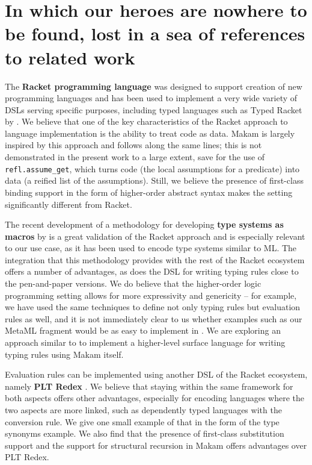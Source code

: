 \section{In which our heroes are nowhere to be found, lost in a sea of
references to related
work}\label{in-which-our-heroes-are-nowhere-to-be-found-lost-in-a-sea-of-references-to-related-work}

\identNormal

The \textbf{Racket programming language} was designed to support
creation of new programming languages \citep{racket-manifesto} and has
been used to implement a very wide variety of DSLs serving specific
purposes, including typed languages such as Typed Racket by
\citet{typed-racket-main-reference}. We believe that one of the key
characteristics of the Racket approach to language implementation is the
ability to treat code as data. Makam is largely inspired by this
approach and follows along the same lines; this is not demonstrated in
the present work to a large extent, save for the use of
\texttt{refl.assume\_get}, which turns code (the local assumptions for a
predicate) into data (a reified list of the assumptions). Still, we
believe the presence of first-class binding support in the form of
higher-order abstract syntax makes the \lamprolog setting significantly
different from Racket.

The recent development of a methodology for developing \textbf{type
systems as macros} by \citet{racket-type-systems-as-macros} is a great
validation of the Racket approach and is especially relevant to our use
case, as it has been used to encode type systems similar to ML. The
integration that this methodology provides with the rest of the Racket
ecosystem offers a number of advantages, as does the
 DSL for writing typing rules close to the
pen-and-paper versions. We do believe that the higher-order logic
programming setting allows for more expressivity and genericity -- for
example, we have used the same techniques to define not only typing
rules but evaluation rules as well, and it is not immediately clear to
us whether examples such as our MetaML fragment would be as easy to
implement in . We are exploring an approach similar
to  to implement a higher-level surface language for
writing typing rules using Makam itself.

Evaluation rules can be implemented using another DSL of the Racket
ecosystem, namely \textbf{PLT Redex} \citep{felleisen2009semantics}. We
believe that staying within the same framework for both aspects offers
other advantages, especially for encoding languages where the two
aspects are more linked, such as dependently typed languages with the
conversion rule. We give one small example of that in the form of the
type synonyms example. We also find that the presence of first-class
substitution support and the support for structural recursion in Makam
offers advantages over PLT Redex.

